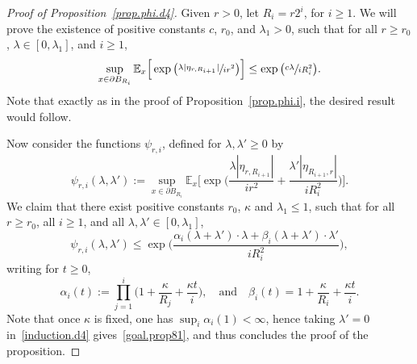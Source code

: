 \begin{proof}[Proof of Proposition~\ref{prop.phi.d4}]
Given $r>0$, let $R_i = r2^i$, for $i\ge 1$. We will prove the existence of positive constants
$c$, $r_0$, and $\lambda_1>0$, such that for all $r\ge r_0$, $\lambda\in[0,\lambda_1]$, and $i\ge 1$,
\begin{equation}\label{goal.prop81}
\sup_{x\in \partial B_{R_i}}\mathbb E_x\Big[\exp\big(\sfrac{\lambda |\eta_{r,R_{i+1}}|}{ir^2}\big)\Big] \le \exp\big(\sfrac{c\lambda}{iR_i^2}\big).
\end{equation}
Note that exactly as in the proof of Proposition~\ref{prop.phi.i}, the desired result would follow.

Now consider the functions $\psi_{r,i}$, defined for $\lambda,\lambda'\ge 0$ by
\[
\psi_{r,i}(\lambda,\lambda'):= \sup_{x\in \partial B_{R_i}}\mathbb E_x\Big[\exp\Big(\frac{\lambda |\eta_{r,R_{i+1}}|}{ir^2}+\frac{\lambda' |\eta_{R_{i+1},r}|}{iR_i^2}\Big)\Big].
\]
We claim that there exist positive constants $r_0$, $\kappa$ and $\lambda_1\le 1$, such that for all $r\ge r_0$, all $i\ge 1$, and all $\lambda, \lambda'\in[0,\lambda_1]$,
\begin{equation}\label{induction.d4}
\psi_{r,i}(\lambda,\lambda') \le \exp\Big(\frac{\alpha_i(\lambda+\lambda')\cdot \lambda+\beta_i(\lambda+\lambda')\cdot\lambda'}{iR_i^2}\Big),
\end{equation}
writing for $t\ge 0$,
\[
\alpha_i(t) := \prod_{j=1}^i\Big(1+\frac{\kappa }{R_j}+\frac {\kappa t} i\Big), \quad \text{and}\quad \beta_i(t)=1+\frac{\kappa }{R_i}+\frac{\kappa t}{i}.
\]
Note that once $\kappa$ is fixed, one has $\sup_i \alpha_i(1)<\infty$, hence taking $ \lambda'=0$ in~\eqref{induction.d4} gives~\eqref{goal.prop81}, and thus concludes the proof of the proposition.


\end{proof}
